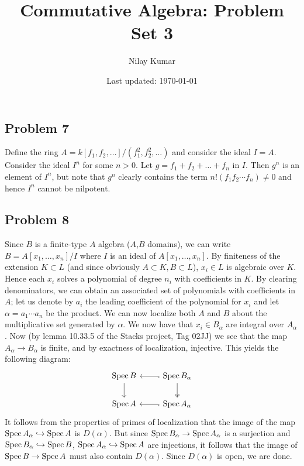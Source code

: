 \documentclass{../../mathnotes}
\title{Commutative Algebra: Problem Set 3}
\author{Nilay Kumar}
\date{Last updated: \today}
\begin{document}
\maketitle

\subsection*{Problem 7}

Define the ring $A=k[f_1,f_2,\ldots]/(f_1^2,f_2^2,\ldots)$ and consider the ideal $I=A$. Consider the ideal
$I^n$ for some $n>0$. Let $g=f_1+f_2+\ldots+f_n$ in $I$. Then $g^n$ is an element of $I^n$, but note that
$g^n$ clearly contains the term $n!(f_1f_2\cdots f_n)\neq0$ and hence $I^n$ cannot be nilpotent.

\subsection*{Problem 8}

Since $B$ is a finite-type $A$ algebra ($A$,$B$ domains), we can write $B=A[x_1,\ldots,x_n]/I$ where $I$ is an ideal of $A[x_1,\ldots,x_n]$.
By finiteness of the extension $K\subset L$ (and since obviously $A\subset K,B\subset L$), $x_i\in L$ is algebraic over $K$.
Hence each $x_i$ solves a polynomial of degree $n_i$ with coefficients in $K$. By clearing denominators, we can obtain an
associated set of polynomials with coefficients in $A$; let us denote by $a_i$ the leading coefficient of the polynomial for $x_i$
and let $\alpha=a_1\cdots a_n$ be the product. We can now localize both $A$ and $B$ about the multiplicative set generated by $\alpha$.
We now have that $x_i\in B_\alpha$ are integral over $A_\alpha$. Now (by lemma 10.33.5 of the Stacks project, Tag 02JJ) we see that
the map $A_\alpha\to B_\alpha$ is finite, and by exactness of localization, injective.
This yields the following diagram:
\begin{equation*}
\begin{tikzcd}
    \Spec B\arrow{d} & \Spec B_\alpha\arrow[hookrightarrow]{l}\arrow[twoheadrightarrow]{d}\\
    \Spec A & \Spec A_\alpha\arrow[hookrightarrow]{l}
\end{tikzcd}
\end{equation*}
It follows from the properties of primes of localization that the image of the map $\operatorname{Spec} A_\alpha\hookrightarrow\operatorname{Spec} A$ is
$D(\alpha)$. But since $\operatorname{Spec} B_\alpha\to\operatorname{Spec} A_\alpha$ is a surjection and $\operatorname{Spec} B_\alpha\hookrightarrow\operatorname{Spec} B$, $\operatorname{Spec} A_\alpha\hookrightarrow\operatorname{Spec} A$
are injections, it follows that the image of $\operatorname{Spec} B\to\operatorname{Spec} A$ must also contain $D(\alpha)$. Since $D(\alpha)$ is open, we are done.
\end{document}
